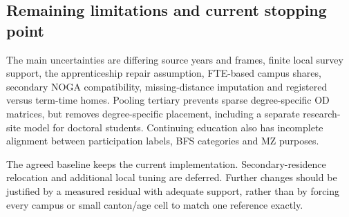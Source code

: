 \documentclass[11pt,a4paper]{article}
\begin{document}
\subsection{Remaining limitations and current stopping point}

The main uncertainties are differing source years and frames, finite local
survey support, the apprenticeship repair assumption, FTE-based campus shares,
secondary NOGA compatibility, missing-distance imputation and registered versus
term-time homes. Pooling tertiary prevents sparse degree-specific OD matrices,
but removes degree-specific placement, including a separate research-site
model for doctoral students. Continuing education also has incomplete alignment
between participation labels, BFS categories and MZ purposes.

The agreed baseline keeps the current implementation. Secondary-residence
relocation and additional local tuning are deferred. Further changes should
be justified by a measured residual with adequate support, rather than by
forcing every campus or small canton/age cell to match one reference exactly.

\appendix
\end{document}
